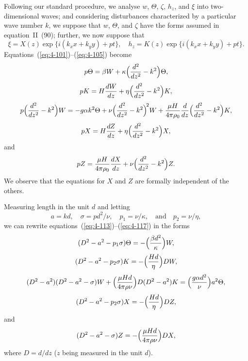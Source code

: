 Following our standard procedure, we analyse $w$, $\Theta$, $\zeta$, $h_z$, and $\xi$ into two-dimensional waves; and considering disturbances characterized by a particular wave number $k$, we suppose that $w$, $\Theta$, and $\zeta$ have the forms assumed in equation~II~(90); further, we now suppose that
\begin{equation}
\label{eq:4-112}
\xi = X(z)\exp\{i(k_x x+k_y y)+pt\}, \quad h_z = K(z)\exp\{i(k_x x+k_y y)+pt\}.
\end{equation}
Equations~(\ref{eq:4-101})--(\ref{eq:4-105}) become
\begin{equation}
\label{eq:4-113}
p\Theta = \beta W + \kappa\Bigl(\frac{d^2}{dz^2}-k^2\Bigr)\Theta,
\end{equation}
\begin{equation}
\label{eq:4-114}
pK = H\frac{dW}{dz}+\eta\Bigl(\frac{d^2}{dz^2}-k^2\Bigr)K,
\end{equation}
\begin{equation}
\label{eq:4-115}
p\Bigl(\frac{d^2}{dz^2}-k^2\Bigr)W = -g\alpha k^2\Theta+\nu\Bigl(\frac{d^2}{dz^2}-k^2\Bigr)^{\!2}W+\frac{\mu H}{4\pi\rho_0}\frac{d}{dz}\Bigl(\frac{d^2}{dz^2}-k^2\Bigr)K,
\end{equation}
\begin{equation}
\label{eq:4-116}
pX = H\frac{dZ}{dz}+\eta\Bigl(\frac{d^2}{dz^2}-k^2\Bigr)X,
\end{equation}
and
\begin{equation}
\label{eq:4-117}
pZ = \frac{\mu H}{4\pi\rho_0}\frac{dX}{dz}+\nu\Bigl(\frac{d^2}{dz^2}-k^2\Bigr)Z.
\end{equation}
We observe that the equations for $X$ and $Z$ are formally independent of the others.

Measuring length in the unit $d$ and letting
\begin{equation}
\label{eq:4-118}
a = kd, \quad \sigma = pd^2/\nu, \quad p_1 = \nu/\kappa, \quad \text{and}\quad p_2 = \nu/\eta,
\end{equation}
we can rewrite equations~(\ref{eq:4-113})--(\ref{eq:4-117}) in the forms
\begin{equation}
\label{eq:4-119}
(D^2-a^2-p_1\sigma)\Theta = -\Bigl(\frac{\beta d^2}{\kappa}\Bigr)W,
\end{equation}
\begin{equation}
\label{eq:4-120}
(D^2-a^2-p_2\sigma)K = -\Bigl(\frac{Hd}{\eta}\Bigr)DW,
\end{equation}
\begin{equation}
\label{eq:4-121}
(D^2-a^2)(D^2-a^2-\sigma)W+\Bigl(\frac{\mu Hd}{4\pi\rho\nu}\Bigr)D(D^2-a^2)K = \Bigl(\frac{g\alpha d^2}{\nu}\Bigr)a^2\Theta,
\end{equation}
\begin{equation}
\label{eq:4-122}
(D^2-a^2-p_2\sigma)X = -\Bigl(\frac{Hd}{\eta}\Bigr)DZ,
\end{equation}
and
\begin{equation}
\label{eq:4-123}
(D^2-a^2-\sigma)Z = -\Bigl(\frac{\mu Hd}{4\pi\rho\nu}\Bigr)DX,
\end{equation}
where $D=d/dz$ ($z$ being measured in the unit $d$).

